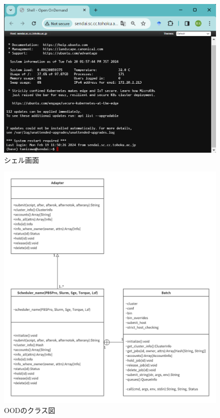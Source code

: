 \begin{figure}[t]
    \centering
    \includegraphics[width=120mm]{./fig/shell.png}
    \caption{シェル画面}
    \label{shell}
\end{figure}

\begin{figure}[b]
    \centering
    \includegraphics[width=120mm]{./fig/class_diagram.png}
    \caption{OODのクラス図}
    \label{class_diagram}
\end{figure}


